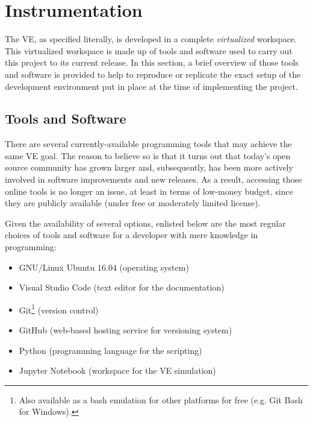%
%
%
%


\section{Instrumentation}

The VE, as specified literally, is developed in a complete \emph{virtualized} workspace. This virtualized workspace is made up of tools and software used to carry out this project to its current release. In this section, a brief overview of those tools and software is provided to help to reproduce or replicate the exact setup of the development environment put in place at the time of implementing the project.

\subsection{Tools and Software}
There are several currently-available programming tools that may achieve the same VE goal. The reason to believe so is that it turns out that today's open source community has grown larger and, subsequently, has been more actively involved in software improvements and new releases. As a result, accessing those online tools is no longer an issue, at least in terms of low-money budget, since they are publicly available (under free or moderately limited license).

Given the availability of several options, enlisted below are the most regular choices of  tools and software for a developer with mere knowledge in programming:
\begin{itemize}
    \item GNU/Linux Ubuntu 16.04 (operating system)
    \item Visual Studio Code (text editor for the documentation)
    \item Git\footnote{Also available as a bash emulation for other platforms for free (e.g. Git Bash for Windows).} (version control)
    \item GitHub (web-based hosting service for versioning system)
    \item Python (programming language for the scripting)
    \item Jupyter Notebook (workspace for the VE simulation)
\end{itemize}

